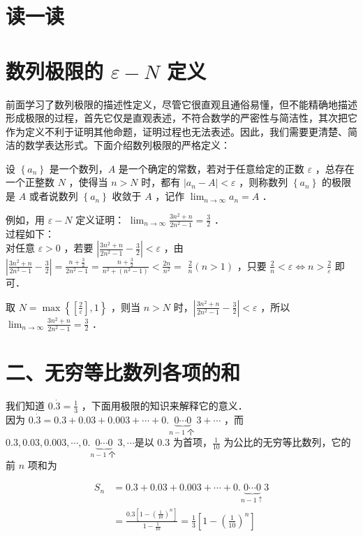 \documentclass[10pt]{article}
\begin{document}
\section*{读一读}
\section*{数列极限的 \(\varepsilon-N\) 定义}
前面学习了数列极限的描述性定义，尽管它很直观且通俗易懂，但不能精确地描述形成极限的过程，首先它仅是直观表述，不符合数学的严密性与简洁性，其次把它作为定义不利于证明其他命题，证明过程也无法表述。因此，我们需要更清楚、简洁的数学表达形式。下面介绍数列极限的严格定义：

设 \(\left\{a_{n}\right\}\) 是一个数列，\(A\) 是一个确定的常数，若对于任意给定的正数 \(\varepsilon\) ，总存在一个正整数 \(N\) ，使得当 \(n>N\) 时，都有 \(\left|a_{n}-A\right|<\varepsilon\) ，则称数列 \(\left\{a_{n}\right\}\) 的极限是 \(A\) 或者说数列 \(\left\{a_{n}\right\}\) 收敛于 \(A\) ，记作 \(\lim _{n \rightarrow \infty} a_{n}=A\) ．

例如，用 \(\varepsilon-N\) 定义证明： \(\lim _{n \rightarrow \infty} \frac{3 n^{2}+n}{2 n^{2}-1}=\frac{3}{2}\) ．\\
过程如下：\\
对任意 \(\varepsilon>0\) ，若要 \(\left|\frac{3 n^{2}+n}{2 n^{2}-1}-\frac{3}{2}\right|<\varepsilon\) ，由 \(\left|\frac{3 n^{2}+n}{2 n^{2}-1}-\frac{3}{2}\right|=\frac{n+\frac{3}{2}}{2 n^{2}-1}=\frac{n+\frac{3}{2}}{n^{2}+\left(n^{2}-1\right)}<\frac{2 n}{n^{2}}=\) \(\frac{2}{n}(n>1)\) ，只要 \(\frac{2}{n}<\varepsilon \Leftrightarrow n>\frac{2}{\varepsilon}\) 即可．

取 \(N=\max \left\{\left[\frac{2}{\varepsilon}\right], 1\right\}\) ，则当 \(n>N\) 时，\(\left|\frac{3 n^{2}+n}{2 n^{2}-1}-\frac{3}{2}\right|<\varepsilon\) ，所以 \(\lim _{n \rightarrow \infty} \frac{3 n^{2}+n}{2 n^{2}-1}=\frac{3}{2}\) ．

\section*{二、无穷等比数列各项的和}
我们知道 \(0 . \dot{3}=\frac{1}{3}\) ，下面用极限的知识来解释它的意义．\\
因为 \(0 . \dot{3}=0.3+0.03+0.003+\cdots+0 . \underbrace{0 \cdots 0}_{n-1 \text { 个 }} 3+\cdots\) ，而 \(0.3,0.03,0.003, \cdots, 0 . \underbrace{0 \cdots 0}_{n-1 \text { 个 }} 3, \cdots\)是以 0.3 为首项，\(\frac{1}{10}\) 为公比的无穷等比数列，它的前 \(n\) 项和为

\[
\begin{aligned}
S_{n} & =0.3+0.03+0.003+\cdots+0 . \underbrace{0 \cdots 0}_{n-1 \uparrow} 3 \\
& =\frac{0.3\left[1-\left(\frac{1}{10}\right)^{n}\right]}{1-\frac{1}{10}}=\frac{1}{3}\left[1-\left(\frac{1}{10}\right)^{n}\right]
\end{aligned}
\]
\end{document}
